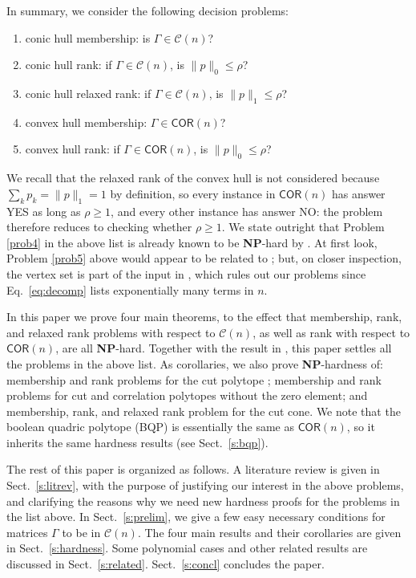 \documentclass[envcountsect,envcountsame]{svjour3}
\theoremstyle{changebreak}                %
\newcommand{\COR}[1]{\mathsf{COR}(#1)}
\newcommand{\CONX}[1]{\mathcal{C}(#1)}
\begin{document}
In summary, we consider the following decision problems:
\begin{enumerate}
\item conic hull membership: is $\Gamma\in\CONX{n}$? \label{prob1}
\item conic hull rank: if $\Gamma\in\CONX{n}$, is $\|p\|_0\le\rho$?
\item conic hull relaxed rank: if $\Gamma\in\CONX{n}$, is $\|p\|_1\le\rho$? \label{prob3}
\item convex hull membership: $\Gamma\in\COR{n}$? \label{prob4}
\item convex hull rank: if $\Gamma\in\COR{n}$, is $\|p\|_0\le\rho$? \label{prob5}
\end{enumerate}
We recall that the relaxed rank of the convex hull is not considered because $\sum_k p_k=\|p\|_1=1$ by definition, so every instance in $\COR{n}$ has answer YES as long as $\rho\ge 1$, and every other instance has answer NO: the problem therefore reduces to checking whether $\rho\ge 1$. We state outright that Problem \ref{prob4} in the above list is already known to be \textbf{NP}-hard by \cite{pitowsky}. At first look, Problem \ref{prob5} above would appear to be related to \cite[Problem 5]{bereg}; but, on closer inspection, the vertex set is part of the input in \cite{bereg}, which rules out our problems since Eq.~\eqref{eq:decomp} lists exponentially many terms in $n$. 

In this paper we prove four main theorems, to the effect that membership, rank, and relaxed rank problems with respect to $\CONX{n}$, as well as rank with respect to $\COR{n}$, are all \textbf{NP}-hard. Together with the result in \cite{pitowsky}, this paper settles all the problems in the above list. As corollaries, we also prove \textbf{NP}-hardness of: membership and rank problems for the cut polytope \cite{dezaLaurent}; membership and rank problems for cut and correlation polytopes without the zero element; and membership, rank, and relaxed rank problem for the cut cone. We note that the boolean quadric polytope (BQP) \cite{bqp} is essentially the same as $\COR{n}$, so it inherits the same hardness results (see Sect.~\ref{s:bqp}).

The rest of this paper is organized as follows. A literature review is given in Sect.~\ref{s:litrev}, with the purpose of justifying our interest in the above problems, and clarifying the reasons why we need new hardness proofs for the problems in the list above. In Sect.~\ref{s:prelim}, we give a few easy necessary conditions for matrices $\Gamma$ to be in $\CONX{n}$. The four main results and their corollaries are given in Sect.~\ref{s:hardness}. Some polynomial cases and other related results are discussed in Sect.~\ref{s:related}. Sect.~\ref{s:concl} concludes the paper.
\end{document}
